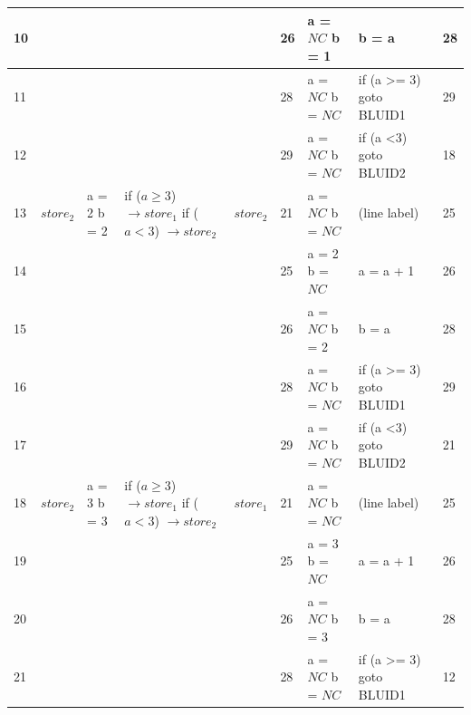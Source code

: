 \begin{table}[htcb]
\begin{tabular}{|p{} | p{} | p{} | p{} | p{} | p{} | p{} | p{} | p{} |}
			\hline
			10&					&								&								&						&	26					&	a = $NC$ \newline b = 1		&		b = a					&	28	\\
			\hline
			11&					&								&								&						&	28					&	a = $NC$ \newline b = $NC$	& if (a \textgreater= 3) goto BLUID1 		&	29	\\
			\hline
			12&					&								&								&						&	29					&	a = $NC$ \newline b = $NC$	& if (a \textless 3) goto BLUID2		&	18	\\
			\hline
			13&$store_2$			&	a = 2	\newline b = 2		&	if ($a \geq 3$) $\rightarrow store_1$ \newline
																	if ($a < 3$) $\rightarrow store_2$ &	$store_2$	&	21					&	a = $NC$ \newline b = $NC$	&	(line label)				&	25	\\
			\hline
			14&					&								&								&						&	25					&	a = 2	\newline b = $NC$	&	a = a + 1					&	26	\\
			\hline
			15&					&								&								&						&	26					&	a = $NC$ \newline b = 2		&	b = a						&	28	\\
			\hline
			16&					&								&								&						&	28					&	a = $NC$ \newline b = $NC$	& if (a \textgreater= 3) goto BLUID1		&	29	\\
			\hline
			17&					&								&								&						&	29					&	a = $NC$ \newline b = $NC$	& if (a \textless 3) goto BLUID2		&	21	\\
			\hline
			18&$store_2$			&	a = 3	\newline b = 3		&	if ($a \geq 3$) $\rightarrow store_1$ \newline
																	if ($a < 3$) $\rightarrow store_2$ &	$store_1$	&	21					&	a = $NC$ \newline b = $NC$	&	(line label)				&	25	\\
			\hline
			19&					&								&								&						&	25					&	a = 3	\newline b = $NC$	&	a = a + 1					&	26	\\
			\hline
			20&					&								&								&						&	26					&	a = $NC$ \newline b = 3		&	b = a						&	28	\\
			\hline
			21&					&								&								&						&	28					&	a = $NC$ \newline b = $NC$	& if (a \textgreater= 3) goto BLUID1		&	12	\\

\end{tabular}
\end{table}

